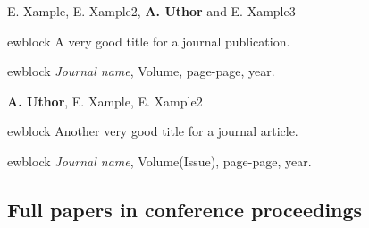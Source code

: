\documentclass[12pt,a4paper]{extarticle}
\begin{document}
\vspace*{1em}

\begin{enumerate}[wide = 0pt, widest = {[4]}, leftmargin =*]

\item[{[1]}] E. Xample, E. Xample2, \textbf{A. Uthor} and E. Xample3

ewblock {A very good title for a journal publication}.

ewblock \emph{Journal name}, Volume, page-page, year.

\vspace*{1em}

\item[{[2]}] \textbf{A. Uthor}, E. Xample, E. Xample2

ewblock {Another very good title for a journal article}.

ewblock \emph{Journal name}, Volume(Issue), page-page, year.

\end{enumerate}

\vspace*{1em}

\subsection*{Full papers in conference proceedings}
\vspace*{1em}
\end{document}
